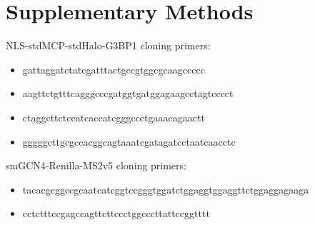 \chapter{Supplementary Methods} \label{sec:appendA}

NLS-stdMCP-stdHalo-G3BP1 cloning primers:
\begin{itemize}
    \itemsep-0.5em
    \item gattaggatctatcgatttactgccgtggcgcaagccccc
    \item aagttctgtttcagggcccgatggtgatggagaagcctagtcccct
    \item ctaggcttctccatcaccatcgggccctgaaacagaactt
    \item gggggcttgcgccacggcagtaaatcgatagatcctaatcaacctc
\end{itemize}

smGCN4-Renilla-MS2v5 cloning primers:
\begin{itemize}
    \itemsep-0.5em
    \item tacacgcggccgcaatcatcggtccgggtggatctggaggtggaggttctggaggagaaga
    \item cctctttccgagccagttcttccctggcccttattccggtttt
\end{itemize}

